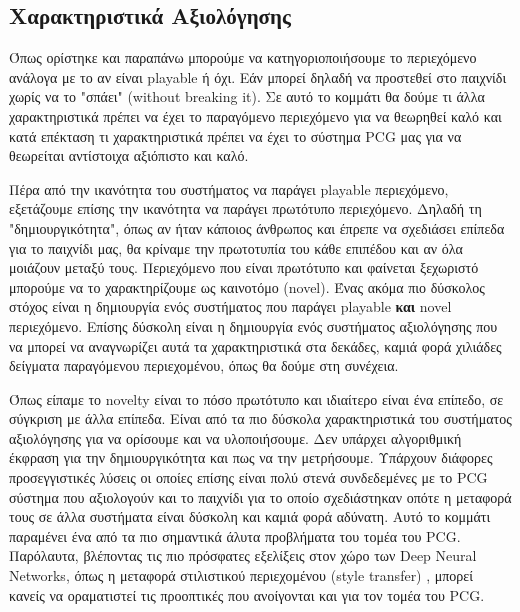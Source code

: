 \subsection{Χαρακτηριστικά Αξιολόγησης}
Όπως ορίστηκε και παραπάνω μπορούμε να κατηγοριοποιήσουμε το περιεχόμενο ανάλογα με το αν είναι playable ή όχι. Εάν μπορεί δηλαδή να προστεθεί στο παιχνίδι χωρίς να το "σπάει" (without breaking it). Σε αυτό το κομμάτι θα δούμε τι άλλα χαρακτηριστικά πρέπει να έχει το παραγόμενο περιεχόμενο για να θεωρηθεί καλό και κατά επέκταση τι χαρακτηριστικά πρέπει να έχει το σύστημα PCG μας για να θεωρείται αντίστοιχα αξιόπιστο και καλό.
\par
Πέρα από την ικανότητα του συστήματος να παράγει playable περιεχόμενο, εξετάζουμε επίσης την ικανότητα να παράγει πρωτότυπο περιεχόμενο. Δηλαδή τη "δημιουργικότητα", όπως αν ήταν κάποιος άνθρωπος και έπρεπε να σχεδιάσει επίπεδα για το παιχνίδι μας, θα κρίναμε την πρωτοτυπία του κάθε επιπέδου και αν όλα μοιάζουν μεταξύ τους. Περιεχόμενο που είναι πρωτότυπο και φαίνεται ξεχωριστό μπορούμε να το χαρακτηρίζουμε ως καινοτόμο (novel). Ένας ακόμα πιο δύσκολος στόχος είναι η δημιουργία ενός συστήματος που παράγει playable \textbf{και} novel περιεχόμενο. Επίσης δύσκολη είναι η δημιουργία ενός συστήματος αξιολόγησης που να μπορεί να αναγνωρίζει αυτά τα χαρακτηριστικά στα δεκάδες, καμιά φορά χιλιάδες δείγματα παραγόμενου περιεχομένου, όπως θα δούμε στη συνέχεια.
\par
Όπως είπαμε το novelty είναι το πόσο πρωτότυπο και ιδιαίτερο είναι ένα επίπεδο, σε σύγκριση με άλλα επίπεδα. Είναι από τα πιο δύσκολα χαρακτηριστικά του συστήματος αξιολόγησης για να ορίσουμε και να υλοποιήσουμε. Δεν υπάρχει αλγοριθμική έκφραση για την δημιουργικότητα και πως να την μετρήσουμε. Υπάρχουν διάφορες προσεγγιστικές λύσεις οι οποίες επίσης είναι πολύ στενά συνδεδεμένες με το PCG σύστημα που αξιολογούν και το παιχνίδι για το οποίο σχεδιάστηκαν οπότε η μεταφορά τους σε άλλα συστήματα είναι δύσκολη και καμιά φορά αδύνατη. Αυτό το κομμάτι παραμένει ένα από τα πιο σημαντικά άλυτα προβλήματα του τομέα του PCG. Παρόλαυτα, βλέποντας τις πιο πρόσφατες εξελίξεις στον χώρο των Deep Neural Networks, όπως η μεταφορά στιλιστικού περιεχομένου (style transfer) \cite{styletransfer}, μπορεί κανείς να οραματιστεί τις προοπτικές που ανοίγονται και για τον τομέα του PCG.
\par
